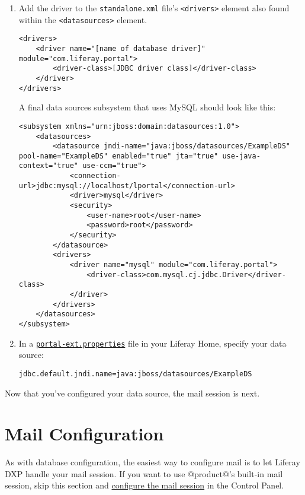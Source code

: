 \begin{enumerate}
\def\labelenumi{\arabic{enumi}.}
\item
  Add the driver to the \texttt{standalone.xml} file's
  \texttt{\textless{}drivers\textgreater{}} element also found within
  the \texttt{\textless{}datasources\textgreater{}} element.

\begin{verbatim}
<drivers>
    <driver name="[name of database driver]" module="com.liferay.portal">
        <driver-class>[JDBC driver class]</driver-class>
    </driver>
</drivers>
\end{verbatim}

  A final data sources subsystem that uses MySQL should look like this:

\begin{verbatim}
<subsystem xmlns="urn:jboss:domain:datasources:1.0">
    <datasources>
        <datasource jndi-name="java:jboss/datasources/ExampleDS" pool-name="ExampleDS" enabled="true" jta="true" use-java-context="true" use-ccm="true">
            <connection-url>jdbc:mysql://localhost/lportal</connection-url>
            <driver>mysql</driver>
            <security>
                <user-name>root</user-name>
                <password>root</password>
            </security>
        </datasource>
        <drivers>
            <driver name="mysql" module="com.liferay.portal">
                <driver-class>com.mysql.cj.jdbc.Driver</driver-class>
            </driver>
        </drivers>
    </datasources>
</subsystem>
\end{verbatim}
\item
  In a
  \href{/docs/7-2/deploy/-/knowledge_base/d/portal-properties}{\texttt{portal-ext.properties}}
  file in your Liferay Home, specify your data source:

\begin{verbatim}
jdbc.default.jndi.name=java:jboss/datasources/ExampleDS
\end{verbatim}
\end{enumerate}

Now that you've configured your data source, the mail session is next.

\section{Mail Configuration}\label{mail-configuration-1}

As with database configuration, the easiest way to configure mail is to
let Liferay DXP handle your mail session. If you want to use @product@'s
built-in mail session, skip this section and
\href{/docs/7-2/deploy/-/knowledge_base/d/configuring-mail}{configure
the mail session} in the Control Panel.

